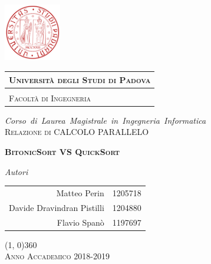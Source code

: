 \documentclass[a4paper, 10pt, twoside, openright, openany]{book}
\begin{document}
\frontmatter

\begin{titlepage} %
\begin{center}


\hspace{0.5cm}
\begin{minipage}{.20\textwidth}
  \includegraphics[height=2.5cm]{./Images/Utility/UNIPD}
\end{minipage}\begin{minipage}{.90\textwidth}
  \begin{table}[H]
  \begin{tabular}{l}
  \scshape{\Large{\bfseries{Università degli Studi di Padova}}} \\
  \hline \\
  \scshape{\Large{Facoltà di Ingegneria}} \\
  \end{tabular}
  \end{table}
\end{minipage}

\vspace{1cm}
\emph{\Large{Corso~di~Laurea~Magistrale~in~Ingegneria~Informatica}} \\
\vspace{3cm}
\scshape{\Large{Relazione di CALCOLO PARALLELO}} \\
\end{center}

\vspace{1cm}
\begin{center}
\scshape{\Large{\bfseries{BitonicSort VS QuickSort}}}
\end{center}

\vspace{3.5cm}

\begin{center}
\emph{Autori}
\vspace{0.2cm}
\begin{table}[h]
\centering
\begin{tabular}{rl}
\vspace{0.2cm}
{Matteo Perin} & {1205718}\\
{Davide Dravindran Pistilli} & {1204880}\\
{Flavio Spanò} & {1197697}\\
\end{tabular}
\end{table}

\end{center}

\vfill
\begin{center}
\hspace{-0.2cm}
\line(1, 0){360}\\
\textsc{Anno Accademico 2018-2019}
\end{center}
\end{titlepage}
\end{document}
